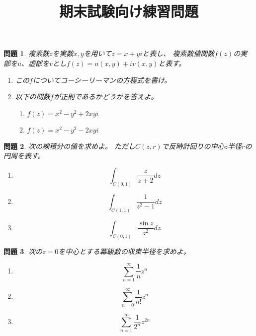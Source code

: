 \documentclass{ltjsarticle}
\title{期末試験向け練習問題}
\date{}
\newtheorem{prob}{問題}
\begin{document}
\maketitle
\vspace{-13mm}

\begin{prob}
    複素数$z$を実数$x, y$を用いて$z=x+yi$と表し、
    複素数値関数$f(z)$の実部を$u$、虚部を$v$とし$f(z)=u(x,y)+iv(x,y)$と表す。
    \begin{enumerate}
        \item この$f$についてコーシーリーマンの方程式を書け。
        \item 以下の関数$f$が正則であるかどうかを答えよ。
        \begin{multicols}{2}
            \begin{enumerate}
                \item $f(z)=x^2-y^2+2xyi$
                \item $f(z)=x^2-y^2-2xyi$
            \end{enumerate}            
        \end{multicols}
    \end{enumerate}
\end{prob}

\begin{prob}
    次の線積分の値を求めよ。
    ただし$C(z,r)$で反時計回りの中心$z$半径$r$の円周を表す。
    \begin{multicols}{3}
        \begin{enumerate}
            \item $$\int_{C(0,1)}\frac{z}{z+2}dz$$
            \item $$\int_{C(1,1)}\frac{1}{z^2-1}dz$$
            \item $$\int_{C(0,1)}\frac{\sin z}{z^2}dz$$
        \end{enumerate}
    \end{multicols}
\end{prob}

\begin{prob}
    次の$z=0$を中心とする冪級数の収束半径を求めよ。
    \begin{multicols}{3}
        \begin{enumerate}
            \item $$\sum_{n=1}^\infty\frac{1}{n}z^n$$
            \item $$\sum_{n=0}^\infty\frac{1}{n!}z^n$$
            \item $$\sum_{n=1}^\infty\frac{1}{2^n}z^{2n}$$
        \end{enumerate}
    \end{multicols}
\end{prob}
\end{document}
